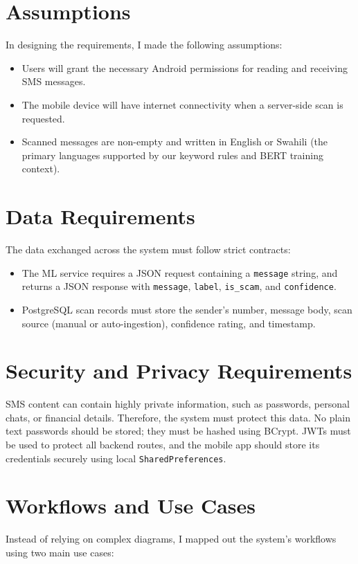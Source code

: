\section{Assumptions}
In designing the requirements, I made the following assumptions:
\begin{itemize}
  \item Users will grant the necessary Android permissions for reading and receiving SMS messages.
  \item The mobile device will have internet connectivity when a server-side scan is requested.
  \item Scanned messages are non-empty and written in English or Swahili (the primary languages supported by our keyword rules and BERT training context).
\end{itemize}

\section{Data Requirements}
The data exchanged across the system must follow strict contracts:
\begin{itemize}
  \item The ML service requires a JSON request containing a \texttt{message} string, and returns a JSON response with \texttt{message}, \texttt{label}, \texttt{is\_scam}, and \texttt{confidence}.
  \item PostgreSQL scan records must store the sender's number, message body, scan source (manual or auto-ingestion), confidence rating, and timestamp.
\end{itemize}

\section{Security and Privacy Requirements}
SMS content can contain highly private information, such as passwords, personal chats, or financial details. Therefore, the system must protect this data. No plain text passwords should be stored; they must be hashed using BCrypt. JWTs must be used to protect all backend routes, and the mobile app should store its credentials securely using local \texttt{SharedPreferences}.

\section{Workflows and Use Cases}
Instead of relying on complex diagrams, I mapped out the system's workflows using two main use cases:

